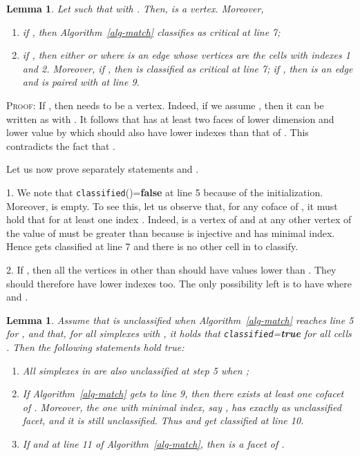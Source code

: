 \documentclass[12pt]{article}
\newtheorem{lem}[thm]{Lemma}
\newenvironment{proof}{\noindent\textsc{Proof: }}{\hfill\par\medskip\par}
\begin{document}
\begin{lem}\label{lem:i=1-2}
Let  such that   with . Then,  is a vertex. Moreover,
\begin{enumerate}
\item if , then Algorithm~\ref{alg-match} classifies  as critical at line 7;
\item if , then either  or  where  is an edge whose vertices are the cells with indexes 1 and 2. Moreover, if , then  is classified as critical at line 7; if , then  is an edge and  is  paired with   at line 9.
\end{enumerate}
\end{lem}

\begin{proof}
If , then  needs to be a vertex. Indeed, if we assume  , then it can be written as  with . It follows that  has at least two faces of lower dimension and lower value by  which should also have lower indexes than that of .
This contradicts the fact that .


Let us now prove separately statements  and .

1. We note that \texttt{classified}()={\bf false} at line 5 because of the initialization. Moreover,  is empty. To see this, let us observe that, for any coface   of ,  it must hold that  for at least one index . Indeed,  is a vertex of  and at any other vertex of    the value of  must be greater than  because  is injective and  has minimal index. Hence  gets classified at line 7 and there is no other cell in  to classify.

2.  If , then all the vertices in  other than  should have   values lower than .
They should therefore have lower indexes too. The only possibility left is to have  where  and .
\end{proof}

\begin{lem}\label{lem:line10}
  Assume that  is unclassified when Algorithm~\ref{alg-match} reaches line 5 for , and that, for all simplexes  with , it holds that \texttt{classified}={\bf true} for all cells . Then the following statements hold true:
\begin{enumerate}
\item[(i)] All simplexes in  are  also unclassified at step 5 when ;
\item[(ii)] If Algorithm~\ref{alg-match} gets to line 9, then there exists at least one cofacet of . Moreover, the one with minimal index, say , has exactly  as unclassified facet, and it is still unclassified. Thus  and  get classified at line 10.
\item[(iii)] If  and  at line 11 of Algorithm~\ref{alg-match}, then  is a facet of .
\end{enumerate}
\end{lem}
\end{document}
